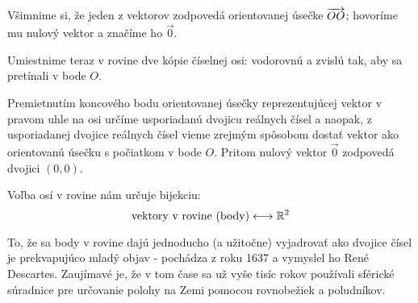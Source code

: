 \begin{center}
\end{center}

Všimnime si, že jeden z vektorov zodpovedá orientovanej úsečke $\overrightarrow{OO}$; hovoríme mu nulový vektor a značíme ho $\vec{0}$.

Umiestnime teraz v rovine dve kópie číselnej osi: vodorovnú a zvislú tak, aby sa pretínali v bode $O$.
\begin{center}
\end{center}

Premietnutím koncového bodu orientovanej úsečky reprezentujúcej vektor v pravom uhle na osi určíme usporiadanú dvojicu reálnych čísel a naopak, z usporiadanej dvojice reálnych čísel vieme zrejmým spôsobom dostať vektor ako orientovanú úsečku s počiatkom v bode $O$. Pritom nulový vektor $\vec{0}$ zodpovedá dvojici $(0,0)$.

Voľba osí v rovine nám určuje bijekciu:
$$ \text{vektory v rovine (body)} \longleftrightarrow \mathbb{R}^2 $$

To, že sa body v rovine dajú jednoducho (a užitočne) vyjadrovať ako dvojice čísel je
prekvapujúco mladý objav - pochádza z roku 1637 a vymyslel ho René
Descartes. Zaujímavé je, že v tom čase sa už vyše tisíc rokov používali sférické
súradnice pre určovanie polohy na Zemi pomocou rovnobežiek a poludníkov.

